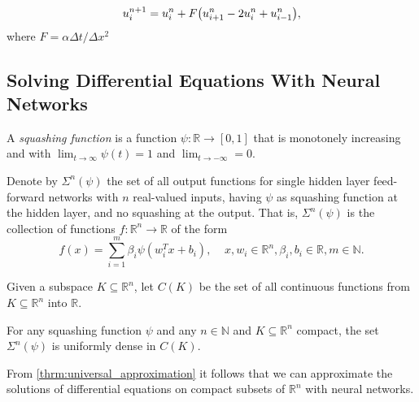 \begin{equation}\label{eq:FE scheme}
    u_i^{n+1} = u_i^n + F \qty(u_{i+1}^n - 2u_i^n + u_{i-1}^n),
\end{equation}
where $F=\alpha \Delta t/\Delta x^2$

\subsection{Solving Differential Equations With Neural Networks}

\begin{definition}
A \emph{squashing function} is a function $\psi\colon\mathbb{R}\to[0,1]$ that is monotonely increasing and with $\lim_{t\to\infty}\psi(t)=1$ and $\lim_{t\to -\infty}=0$.
\end{definition}

Denote by $\Sigma^n(\psi)$ the set of all output functions for single hidden layer feed-forward networks with $n$ real-valued inputs, having $\psi$ as squashing function at the hidden layer, and no squashing at the output. That is, $\Sigma^n(\psi)$ is the collection of functions $f\colon\mathbb{R}^n\to\mathbb{R}$ of the form
\begin{equation*}
    f(x)=\sum_{i=1}^m\beta_i\psi(w^T_ix + b_i),\;\;\;\;x,w_i\in\mathbb{R}^n,\beta_i,b_i\in\mathbb{R},m\in\mathbb{N}.
\end{equation*}

Given a subspace $K\subseteq\mathbb{R}^n$, let $C(K)$ be the set of all continuous functions from $K\subseteq\mathbb{R}^n$ into $\mathbb{R}$.

\begin{theorem}\label{thrm:universal_approximation}
For any squashing function $\psi$ and any $n\in\mathbb{N}$ and $K\subseteq\mathbb{R}^n$ compact, the set $\Sigma^n(\psi)$ is uniformly dense in $C(K)$.
\end{theorem}

From \autoref{thrm:universal_approximation} it follows that we can approximate the solutions of differential equations on compact subsets of $\mathbb{R}^n$ with neural networks.

